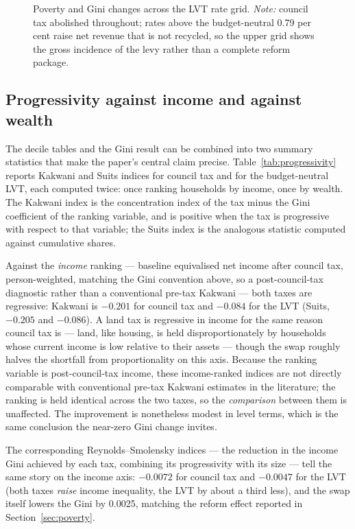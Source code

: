 \begin{figure}[htbp]
\centering
{}
\caption{Poverty and Gini changes across the LVT rate grid. \emph{Note:} council tax abolished throughout; rates above the budget-neutral 0.79 per cent raise net revenue that is not recycled, so the upper grid shows the gross incidence of the levy rather than a complete reform package.}
\label{fig:povgini}
\end{figure}

\subsection{Progressivity against income and against wealth}
\label{sec:progressivity}

The decile tables and the Gini result can be combined into two summary statistics that make the paper's central claim precise. Table~\ref{tab:progressivity} reports Kakwani and Suits indices for council tax and for the budget-neutral LVT, each computed twice: once ranking households by income, once by wealth. The Kakwani index is the concentration index of the tax minus the Gini coefficient of the ranking variable, and is positive when the tax is progressive with respect to that variable; the Suits index is the analogous statistic computed against cumulative shares.

Against the \emph{income} ranking --- baseline equivalised net income after council tax, person-weighted, matching the Gini convention above, so a post-council-tax diagnostic rather than a conventional pre-tax Kakwani --- both taxes are regressive: Kakwani is $-0.201$ for council tax and $-0.084$ for the LVT (Suits, $-0.205$ and $-0.086$). A land tax is regressive in income for the same reason council tax is --- land, like housing, is held disproportionately by households whose current income is low relative to their assets --- though the swap roughly halves the shortfall from proportionality on this axis. Because the ranking variable is post-council-tax income, these income-ranked indices are not directly comparable with conventional pre-tax Kakwani estimates in the literature; the ranking is held identical across the two taxes, so the \emph{comparison} between them is unaffected. The improvement is nonetheless modest in level terms, which is the same conclusion the near-zero Gini change invites.

The corresponding Reynolds--Smolensky indices --- the reduction in the income Gini achieved by each tax, combining its progressivity with its size --- tell the same story on the income axis: $-0.0072$ for council tax and $-0.0047$ for the LVT (both taxes \emph{raise} income inequality, the LVT by about a third less), and the swap itself lowers the Gini by 0.0025, matching the reform effect reported in Section~\ref{sec:poverty}.

